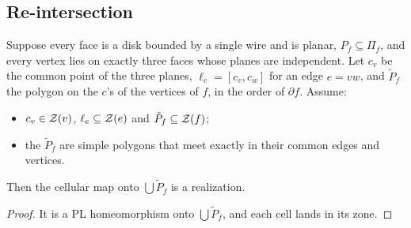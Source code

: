 \subsection{Re-intersection}

\begin{proposition}\label{prop:B}
Suppose every face is a disk bounded by a single wire and is planar, $P_f\subseteq\Pi_f$, and every vertex lies on exactly three faces whose planes are
independent. Let $c_v$ be the common point of the three planes, $\ell_e=[c_v,c_w]$ for an edge $e=vw$, and
$\tilde P_f$ the polygon on the $c$'s of the vertices of $f$, in the order of $\partial f$. Assume:
\begin{itemize}
\item $c_v\in\mathcal{Z}(v)$, $\ell_e\subseteq\mathcal{Z}(e)$ and $\tilde P_f\subseteq\mathcal{Z}(f)$;
\item the $\tilde P_f$ are simple polygons that meet exactly in their common edges and vertices.
\end{itemize}
Then the cellular map onto $\bigcup\tilde P_f$ is a realization.
\end{proposition}
\begin{proof}
It is a PL homeomorphism onto $\bigcup\tilde P_f$, and each cell lands in its zone.
\end{proof}

